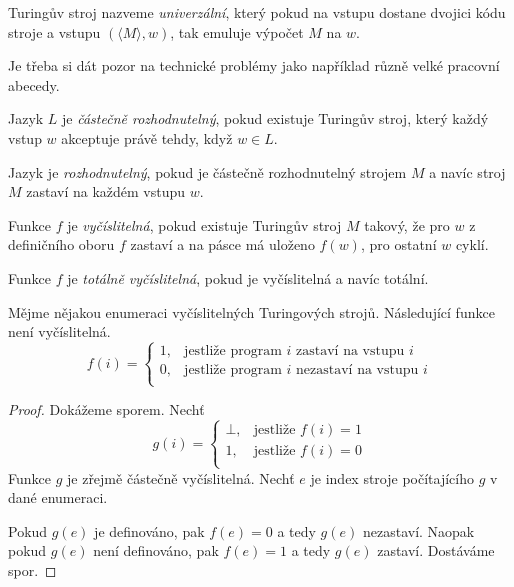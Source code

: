 \begin{definition}[Univerzální TS]
Turingův stroj nazveme {\em univerzální},
který pokud na vstupu dostane dvojici kódu stroje a vstupu
$(\langle M \rangle, w)$, tak emuluje výpočet $M$ na $w$.
\end{definition}

Je třeba si dát pozor na technické problémy jako například různě velké
pracovní abecedy.

\begin{definition}
    Jazyk $L$ je {\em částečně rozhodnutelný}, pokud existuje Turingův
    stroj, který každý vstup $w$ akceptuje právě tehdy, když $w \in L$.

    Jazyk je {\em rozhodnutelný}, pokud je částečně rozhodnutelný
    strojem $M$ a navíc stroj $M$ zastaví na každém vstupu $w$.

    Funkce $f$ je {\em vyčíslitelná}, pokud existuje Turingův
    stroj $M$ takový, že pro $w$ z definičního oboru $f$ zastaví a na pásce má
    uloženo $f(w)$, pro ostatní $w$ cyklí.

    Funkce $f$ je {\em totálně vyčíslitelná}, pokud je vyčíslitelná a
    navíc totální.
\end{definition}


\begin{theorem}
Mějme nějakou enumeraci vyčíslitelných Turingových strojů.
Následující funkce není vyčíslitelná.
\[
    f(i) =
    \begin{cases}
        1, & \text{jestliže program } i \text { zastaví na vstupu } i \\
        0, & \text{jestliže program } i \text { nezastaví na vstupu } i \\
    \end{cases}
\]
\end{theorem}

\begin{proof}
Dokážeme sporem. Nechť
\[
    g(i) =
    \begin{cases}
        \bot, & \text{jestliže } f(i) = 1 \\
        1, & \text{jestliže } f(i) = 0 \\
    \end{cases}
\]
Funkce $g$ je zřejmě částečně vyčíslitelná. Nechť $e$ je index stroje
počítajícího $g$ v dané enumeraci.

Pokud $g(e)$ je definováno, pak $f(e) = 0$ a tedy $g(e)$ nezastaví. Naopak
pokud $g(e)$ není definováno, pak $f(e) = 1$ a tedy $g(e)$ zastaví.
Dostáváme spor.
\end{proof}


